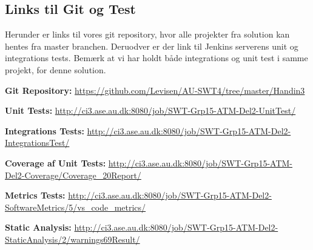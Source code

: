 
\subsection{Links til Git og Test}

Herunder er links til vores git repository, hvor alle projekter fra solution kan hentes fra master branchen.
Deruodver er der link til Jenkins serverens unit og integrations tests. Bemærk at vi har holdt både integrations og unit test i samme projekt, for denne solution.

\textbf{Git Repository: } \url{https://github.com/Levisen/AU-SWT4/tree/master/Handin3}

\textbf{Unit Tests: } \url{http://ci3.ase.au.dk:8080/job/SWT-Grp15-ATM-Del2-UnitTest/}

\textbf{Integrations Tests: } \url{http://ci3.ase.au.dk:8080/job/SWT-Grp15-ATM-Del2-IntegrationsTest/}

\textbf{Coverage af Unit Tests: } \url{http://ci3.ase.au.dk:8080/job/SWT-Grp15-ATM-Del2-Coverage/Coverage_20Report/}

\textbf{Metrics Tests: } \url{http://ci3.ase.au.dk:8080/job/SWT-Grp15-ATM-Del2-SoftwareMetrics/5/vs_code_metrics/}

\textbf{Static Analysis: } \url{http://ci3.ase.au.dk:8080/job/SWT-Grp15-ATM-Del2-StaticAnalysis/2/warnings69Result/}
